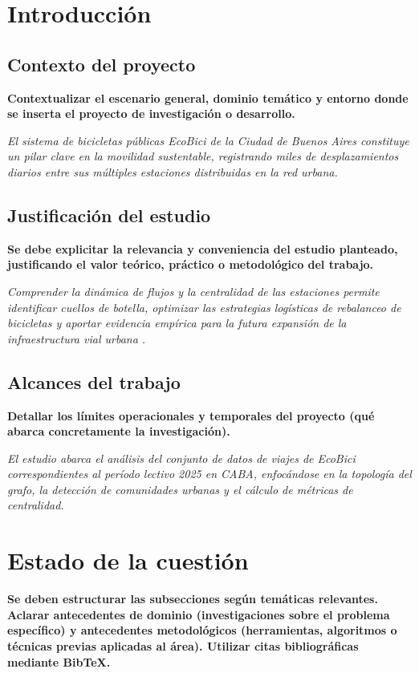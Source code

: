 \documentclass[12pt, a4paper]{article}
\begin{document}
\newpage
\tableofcontents
\newpage




\section{Introducción}

\subsection{Contexto del proyecto}
\textbf{Contextualizar el escenario general, dominio temático y entorno donde se inserta el proyecto de investigación o desarrollo.}

\vspace{0.2cm}
\noindent \textit{El sistema de bicicletas públicas EcoBici de la Ciudad de Buenos Aires constituye un pilar clave en la movilidad sustentable, registrando miles de desplazamientos diarios entre sus múltiples estaciones distribuidas en la red urbana.}

\subsection{Justificación del estudio}
\textbf{Se debe explicitar la relevancia y conveniencia del estudio planteado, justificando el valor teórico, práctico o metodológico del trabajo.}

\vspace{0.2cm}
\noindent \textit{Comprender la dinámica de flujos y la centralidad de las estaciones permite identificar cuellos de botella, optimizar las estrategias logísticas de rebalanceo de bicicletas y aportar evidencia empírica para la futura expansión de la infraestructura vial urbana \cite{gonzalez2022ecobici}.}

\subsection{Alcances del trabajo}
\textbf{Detallar los límites operacionales y temporales del proyecto (qué abarca concretamente la investigación).}

\vspace{0.2cm}
\noindent \textit{El estudio abarca el análisis del conjunto de datos de viajes de EcoBici correspondientes al período lectivo 2025 en CABA, enfocándose en la topología del grafo, la detección de comunidades urbanas y el cálculo de métricas de centralidad.}

\section{Estado de la cuestión}
\textbf{Se deben estructurar las subsecciones según temáticas relevantes. Aclarar antecedentes de dominio (investigaciones sobre el problema específico) y antecedentes metodológicos (herramientas, algoritmos o técnicas previas aplicadas al área). Utilizar citas bibliográficas mediante BibTeX.}
\end{document}
